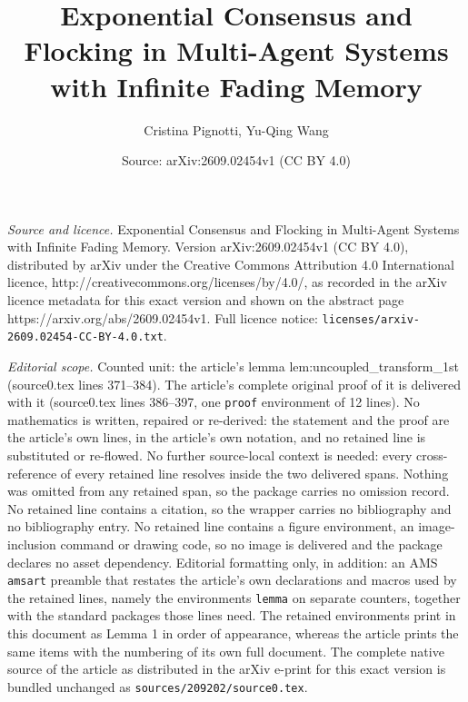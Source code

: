 \documentclass[10pt,a4paper]{amsart}
\title{Exponential Consensus and Flocking in Multi-Agent Systems with Infinite Fading Memory}
\author{Cristina Pignotti, Yu-Qing Wang}
\date{Source: arXiv:2609.02454v1 (CC BY 4.0)}
\begin{document}
\maketitle

\noindent\emph{Source and licence.} Exponential Consensus and Flocking in Multi-Agent Systems with Infinite Fading Memory. Version arXiv:2609.02454v1 (CC BY 4.0), distributed by arXiv under the Creative Commons Attribution 4.0 International licence, http://creativecommons.org/licenses/by/4.0/, as recorded in the arXiv licence metadata for this exact version and shown on the abstract page https://arxiv.org/abs/2609.02454v1. Full licence notice: \texttt{licenses/arxiv-2609.02454-CC-BY-4.0.txt}.\par\smallskip

\noindent\textit{Editorial scope.} Counted unit: the article's lemma lem:uncoupled\_transform\_1st (source0.tex lines 371--384). The article's complete original proof of it is delivered with it (source0.tex lines 386--397, one \texttt{proof} environment of 12 lines). No mathematics is written, repaired or re-derived: the statement and the proof are the article's own lines, in the article's own notation, and no retained line is substituted or re-flowed.  No further source-local context is needed: every cross-reference of every retained line resolves inside the two delivered spans.  Nothing was omitted from any retained span, so the package carries no omission record.  No retained line contains a citation, so the wrapper carries no bibliography and no bibliography entry.  No retained line contains a figure environment, an image-inclusion command or drawing code, so no image is delivered and the package declares no asset dependency.  Editorial formatting only, in addition: an AMS \texttt{amsart} preamble that restates the article's own declarations and macros used by the retained lines, namely the environments \texttt{lemma} on separate counters, together with the standard packages those lines need.  The retained environments print in this document as Lemma 1 in order of appearance, whereas the article prints the same items with the numbering of its own full document.  The complete native source of the article as distributed in the arXiv e-print for this exact version is bundled unchanged as \texttt{sources/209202/source0.tex}.
\end{document}
